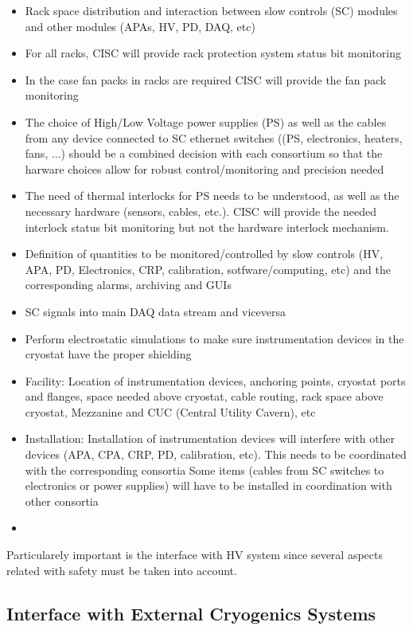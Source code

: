 \begin{itemize}
\item Rack space distribution and interaction between slow controls (SC) modules and other modules (APAs, HV, PD, DAQ, etc)
\item For all racks, CISC will provide rack protection system status bit monitoring
\item In the case fan packs in racks are required CISC will provide the fan pack monitoring
\item The choice of High/Low Voltage power supplies (PS) as well as the cables from any device connected to SC ethernet switches
  ((PS, electronics, heaters, fans, ...) should be a combined decision with each consortium so that the harware choices 
  allow for robust control/monitoring and precision needed 
\item The need of thermal interlocks for PS needs to be understood, as well as the necessary hardware (sensors, cables, etc.).
  CISC will provide the needed interlock status bit monitoring but not the hardware interlock mechanism.
\item Definition of quantities to be monitored/controlled by slow controls (HV, APA, PD, Electronics, CRP, calibration, sotfware/computing,  etc)
  and the corresponding alarms, archiving and GUIs
\item SC signals into main DAQ data stream and viceversa
\item Perform electrostatic simulations to make sure instrumentation devices in the cryostat have the proper shielding 
\item Facility: Location of instrumentation devices, anchoring points, cryostat ports and flanges, space needed above cryostat, cable routing, rack space above cryostat, Mezzanine and CUC (Central Utility Cavern), etc 
\item Installation: Installation of instrumentation devices will interfere with other devices (APA, CPA, CRP, PD, calibration, etc). This needs to be coordinated with the corresponding consortia
  Some items (cables from SC switches to electronics or power supplies) will have to be installed in coordination with other consortia
\item 
\end{itemize}


Particularely important is the interface with HV system since several aspects related with safety must be taken into account. 


\subsection{Interface with External Cryogenics Systems}
\label{sec:fdsp-slow-cryo-ext-cryo}

